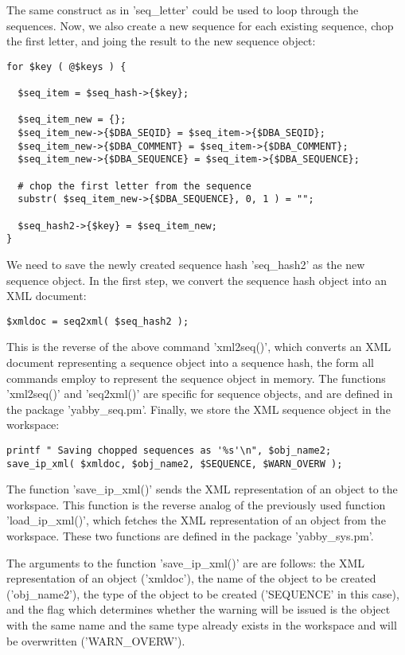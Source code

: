 The same construct as in 'seq\_letter' could be used to loop through
the sequences. Now, we also create a new sequence for each existing
sequence, chop the first letter, and joing the result to the new
sequence object:

\begin{verbatim}
for $key ( @$keys ) {

  $seq_item = $seq_hash->{$key};

  $seq_item_new = {};
  $seq_item_new->{$DBA_SEQID} = $seq_item->{$DBA_SEQID};
  $seq_item_new->{$DBA_COMMENT} = $seq_item->{$DBA_COMMENT};
  $seq_item_new->{$DBA_SEQUENCE} = $seq_item->{$DBA_SEQUENCE};

  # chop the first letter from the sequence
  substr( $seq_item_new->{$DBA_SEQUENCE}, 0, 1 ) = "";

  $seq_hash2->{$key} = $seq_item_new;
}
\end{verbatim}

We need to save the newly created sequence hash 'seq\_hash2' as the
new sequence object. In the first step, we convert the sequence hash
object into an XML document:

\begin{verbatim}
$xmldoc = seq2xml( $seq_hash2 );
\end{verbatim}

This is the reverse of the above command 'xml2seq()', which converts
an XML document representing a sequence object into a sequence hash,
the form all commands employ to represent the sequence object in
memory.  The functions 'xml2seq()' and 'seq2xml()' are specific for
sequence objects, and are defined in the package 'yabby\_seq.pm'.
Finally, we store the XML sequence object in the workspace:

\begin{verbatim}
printf " Saving chopped sequences as '%s'\n", $obj_name2;
save_ip_xml( $xmldoc, $obj_name2, $SEQUENCE, $WARN_OVERW );
\end{verbatim}

The function 'save\_ip\_xml()' sends the XML representation of an
object to the workspace. This function is the reverse analog of
the previously used function 'load\_ip\_xml()', which fetches the
XML representation of an object from the workspace. These two
functions are defined in the package 'yabby\_sys.pm'.

The arguments to the function 'save\_ip\_xml()' are are follows:
the XML representation of an object ('xmldoc'), the name of the
object to be created ('obj\_name2'), the type of the object to be
created ('SEQUENCE' in this case), and the flag which determines
whether the warning will be issued is the object with the same
name and the same type already exists in the workspace and will
be overwritten ('WARN\_OVERW').

